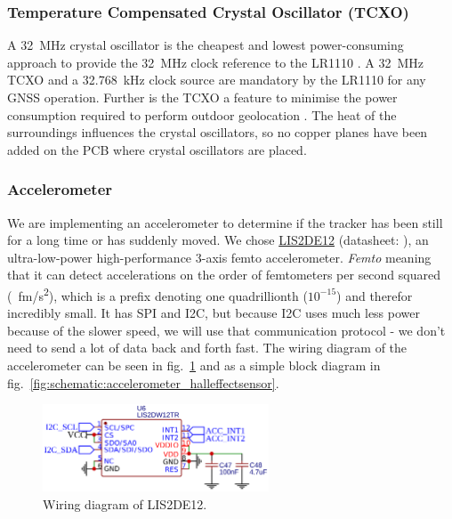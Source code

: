\subsubsection{Temperature Compensated Crystal Oscillator (TCXO)}
A \SI{32}{\mega\hertz} crystal oscillator is the cheapest and lowest power-consuming approach to provide the \SI{32}{\mega\hertz} clock reference to the LR1110 \cite[p.~50]{LR1110_user_manual}.
A \SI{32}{\mega\hertz} \ac{TCXO} and a \SI{32.768}{\kilo\hertz} clock source are mandatory by the LR1110 for any \ac{GNSS} operation. Further is the \ac{TCXO} a feature to minimise the power consumption required to perform outdoor geolocation \cite[p.~51, p.~132]{LR1110_user_manual}. The heat of the surroundings influences the crystal oscillators, so no copper planes have been added on the \ac{PCB} where crystal oscillators are placed. %

\subsubsection{Accelerometer}
We are implementing an accelerometer to determine if the tracker has been still for a long time or has suddenly moved. We chose \hyperref[bom:lis2de12]{LIS2DE12} (datasheet: ), an ultra-low-power high-performance 3-axis femto accelerometer. \textit{Femto} meaning that it can detect accelerations on the order of femtometers per second squared (\SI{}{\femto\meter/\second^2}), which is a prefix denoting one quadrillionth ($10^{-15}$) and therefor incredibly small. It has \ac{SPI} and \ac{I2C}, but because \ac{I2C} uses much less power because of the slower speed, we will use that communication protocol - we don't need to send a lot of data back and forth fast. The wiring diagram of the accelerometer can be seen in fig.~\ref{fig:schematic:LIS2DE12} and as a simple block diagram in fig.~\ref{fig:schematic:accelerometer_halleffectsensor}.

\begin{figure}[H]
  \centering
  \includegraphics[width=0.6\textwidth]{figures/LIS2DE12.png}
  \caption{Wiring diagram of LIS2DE12.}
  \label{fig:schematic:LIS2DE12}
\end{figure}

